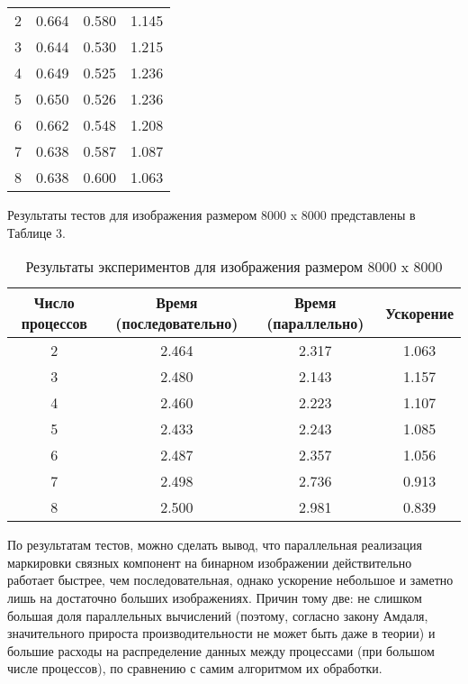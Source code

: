 \documentclass{report}
\begin{document}
\begin{itemize}
\begin{itemize}
\begin{table}[!h]
\begin{tabular}{|c|c|c|c|}
            \hline
			2        & 0.664           & 0.580       & 1.145      \\
			3        & 0.644           & 0.530       & 1.215      \\
			4        & 0.649           & 0.525       & 1.236      \\
			5        & 0.650           & 0.526       & 1.236      \\
			6        & 0.662           & 0.548       & 1.208      \\
			7        & 0.638           & 0.587       & 1.087      \\
			8        & 0.638           & 0.600       & 1.063      \\
            \hline
		\end{tabular}
	\end{table}
	\par Результаты тестов для изображения размером 8000 x 8000 представлены в Таблице 3.
	\begin{table}[!h]
		\caption{Результаты экспериментов для изображения размером 8000 x 8000}
		\centering
		\begin{tabular}{|c|c|c|c|}
            \hline
			Число процессов & Время (последовательно) & Время (параллельно) & Ускорение  \\
            \hline
			2        & 2.464           & 2.317       & 1.063      \\
			3        & 2.480           & 2.143       & 1.157      \\
			4        & 2.460           & 2.223       & 1.107      \\
			5        & 2.433           & 2.243       & 1.085      \\
			6        & 2.487           & 2.357       & 1.056      \\
			7        & 2.498           & 2.736       & 0.913      \\
			8        & 2.500           & 2.981       & 0.839      \\
            \hline
		\end{tabular}
	\end{table}
	\par По результатам тестов, можно сделать вывод, что параллельная реализация маркировки связных компонент на бинарном изображении действительно работает быстрее, чем последовательная, однако ускорение небольшое и заметно лишь на достаточно больших изображениях. Причин тому две: не слишком большая доля параллельных вычислений (поэтому, согласно закону Амдаля, значительного прироста производительности не может быть даже в теории) и большие расходы на распределение данных между процессами (при большом числе процессов), по сравнению с самим алгоритмом их обработки.

\end{itemize}
\end{itemize}
\end{document}
